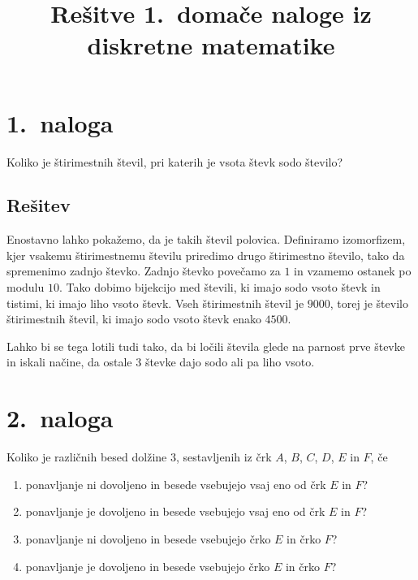 \documentclass[11pt]{article}
\title{Rešitve 1.\ domače naloge iz diskretne matematike}
\author{}
\date{}
\begin{document}
\maketitle

\section*{1.~naloga}
    Koliko je štirimestnih števil, pri katerih je vsota števk sodo število?
\subsection*{Rešitev}
    Enostavno lahko pokažemo, da je takih števil polovica. Definiramo izomorfizem, kjer vsakemu štirimestnemu številu 
    priredimo drugo štirimestno število, tako da spremenimo zadnjo števko. Zadnjo števko povečamo za \(1\) in 
    vzamemo ostanek po modulu \(10\). Tako dobimo bijekcijo med števili, ki imajo sodo vsoto števk in tistimi, ki
    imajo liho vsoto števk. Vseh štirimestnih števil je \(9000\), torej je število štirimestnih števil, ki imajo
    sodo vsoto števk enako \(4500\).

    Lahko bi se tega lotili tudi tako, da bi ločili števila glede na parnost prve števke in iskali načine, da ostale \(3\) števke 
    dajo sodo ali pa liho vsoto.

\section*{2.~naloga}
Koliko je različnih besed dolžine \(3\), sestavljenih iz črk \(A\), \(B\), \(C\), \(D\), \(E\) in \(F\), če \begin{enumerate}[label = (\alph*)]
    \item ponavljanje ni dovoljeno in besede vsebujejo vsaj eno od črk \(E\) in \(F\)?
    \item ponavljanje je dovoljeno in besede vsebujejo vsaj eno od črk \(E\) in \(F\)?
    \item ponavljanje ni dovoljeno in besede vsebujejo črko \(E\) in črko \(F\)?
    \item ponavljanje je dovoljeno in besede vsebujejo črko \(E\) in črko \(F\)?
\end{enumerate}
\end{document}
